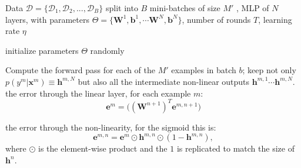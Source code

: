 \begin{algorithm}[th!]

   \caption{Mini-batch SGD with Back-Propagation}

\begin{algorithmic}[1]
\label{algo:backprop}

Data $\mathcal{D}=\{\mathcal{D}_1,\mathcal{D}_2,...,\mathcal{D}_B\}$ split into $B$ mini-batches of size $M'$%
, MLP of $N$ layers, with parameters $\Theta=\{\mathbf{W}^1, \mathbf{b}^1, \cdots \mathbf{W}^N, \mathbf{b}^N\}$, number of rounds $T$, learning rate $\eta$

   \STATE initialize parameters $\Theta$ randomly


	\vspace{0.3cm}
	\STATE Compute the {forward pass} for each of the $M'$ examples in batch $b$;
	 keep not only $p(y^m|\mathbf{x}^m) \equiv \mathbf{h}^{m,N}$ but also all the intermediate non-linear outputs $\mathbf{h}^{m,1} \cdots \mathbf{h}^{m,N}$.
	\ENDFOR	
	\vspace{0.3cm}
		\ENDFOR	
        \ELSE
		 the error through the linear layer, for each example $m$:
        $$\mathbf{e}^{m} = \Big((\mathbf{W}^{n+1})^T \mathbf{e}^{m,n+1}\Big)$$

		 the error through the non-linearity, for the sigmoid this is:
        $$\mathbf{e}^{m,n} = \mathbf{e}^{m} \odot \mathbf{h}^{m,n} \odot (\mathbf{\mathrm{1}}-\mathbf{h}^{m,n}),$$
        where $\odot$ is the element-wise product and the $\mathbf{\mathrm{1}}$ is replicated to match the size of $\mathbf{h}^n$.

		\ENDFOR	
        \ENDIF


\end{algorithmic}
\end{algorithm}
